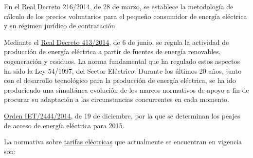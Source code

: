 En el
\href{http://www.boe.es/diario_boe/txt.php?id=BOE-A-2014-3376}{Real
Decreto 216/2014}, de 28 de marzo, se establece la metodología de
cálculo de los precios voluntarios para el pequeño consumidor de energía
eléctrica y su régimen jurídico de contratación.

Mediante el
\href{https://www.boe.es/diario_boe/txt.php?id=BOE-A-2014-6123}{Real
Decreto 413/2014}, de 6 de junio, se regula la actividad de producción
de energía eléctrica a partir de fuentes de energía renovables,
cogeneración y residuos. La norma fundamental que ha regulado estos
aspectos ha sido la Ley 54/1997, del Sector Eléctrico. Durante los
últimos 20 años, junto con el desarrollo tecnológico para la producción
de energía eléctrica, se ha ido produciendo una simultánea evolución de
los marcos normativos de apoyo a fin de procurar su adaptación a las
circunstancias concurrentes en cada momento.

\href{http://www.boe.es/diario_boe/txt.php?id=BOE-A-2014-13475}{Orden
IET/2444/2014}, de 19 de diciembre, por la que se determinan los peajes
de acceso de energía eléctrica para 2015.

La normativa sobre
\href{http://www.minetad.gob.es/energia/electricidad/Tarifas/Paginas/index.aspx}{tarifas
eléctricas} que actualmente se encuentran en vigencia son:

